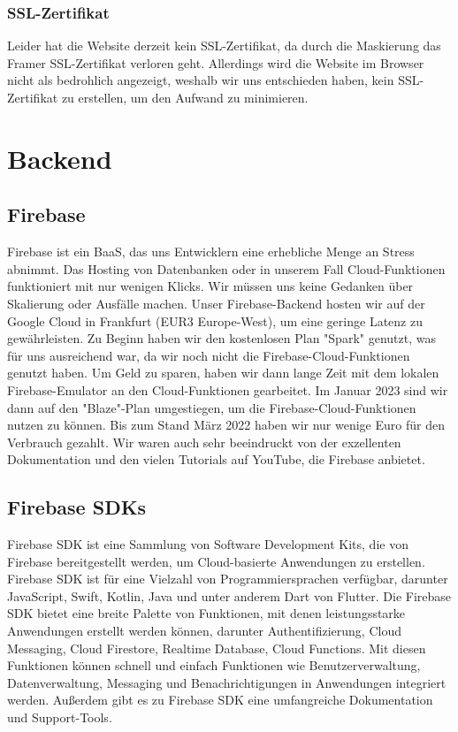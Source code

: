 \subsubsection{SSL-Zertifikat}
Leider hat die Website derzeit kein SSL-Zertifikat, da durch
die Maskierung das Framer SSL-Zertifikat verloren geht.
Allerdings wird die Website im Browser nicht als bedrohlich
angezeigt, weshalb wir uns entschieden haben, kein
SSL-Zertifikat zu erstellen, um den Aufwand zu minimieren.

\section{Backend}

\subsection{Firebase}
Firebase ist ein BaaS, das uns Entwicklern eine erhebliche Menge an Stress abnimmt. Das Hosting von Datenbanken oder in unserem Fall Cloud-Funktionen funktioniert mit nur wenigen Klicks. Wir müssen uns keine Gedanken über Skalierung oder Ausfälle machen. Unser Firebase-Backend hosten wir auf der Google Cloud in Frankfurt (EUR3 Europe-West), um eine geringe Latenz zu gewährleisten. Zu Beginn haben wir den kostenlosen Plan "Spark" genutzt, was für uns ausreichend war, da wir noch nicht die Firebase-Cloud-Funktionen genutzt haben. Um Geld zu sparen, haben wir dann lange Zeit mit dem lokalen Firebase-Emulator an den Cloud-Funktionen gearbeitet. Im Januar 2023 sind wir dann auf den "Blaze"-Plan umgestiegen, um die Firebase-Cloud-Funktionen nutzen zu können. Bis zum Stand März 2022 haben wir nur wenige Euro für den Verbrauch gezahlt. Wir waren auch sehr beeindruckt von der exzellenten Dokumentation und den vielen Tutorials auf YouTube, die Firebase anbietet.


\subsection{Firebase SDKs}
Firebase SDK ist eine Sammlung von Software Development Kits, die von Firebase bereitgestellt werden, um Cloud-basierte Anwendungen zu erstellen.
Firebase SDK ist für eine Vielzahl von Programmiersprachen verfügbar, darunter JavaScript, Swift, Kotlin, Java und unter anderem Dart von Flutter.
Die Firebase SDK bietet eine breite Palette von Funktionen, mit denen leistungsstarke Anwendungen erstellt werden können, darunter Authentifizierung, Cloud Messaging, Cloud Firestore, Realtime Database, Cloud Functions. Mit diesen Funktionen können schnell und einfach Funktionen wie Benutzerverwaltung, Datenverwaltung, Messaging und Benachrichtigungen in Anwendungen integriert werden. Außerdem gibt es zu Firebase SDK eine umfangreiche Dokumentation und Support-Tools.


